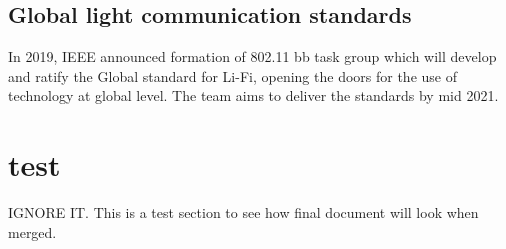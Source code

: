 \documentclass[notitlepage]{article}
\begin{document}
\subsection{Global light communication standards}

In 2019, IEEE announced formation of 802.11 bb task group which will develop
and ratify the Global standard for Li-Fi, opening the doors for the use of
technology at global level. 
The team aims to deliver the standards by mid 2021.


\printbibliography[heading=subbibliography]


\vspace{2in}
\section{test}
IGNORE IT. This is a test section to see how final document will look when merged. \\

\lipsum[1-1]
\printbibliography[heading=subbibliography]
\end{document}
